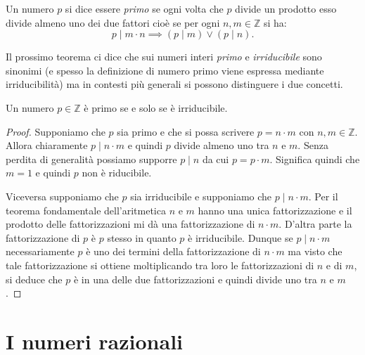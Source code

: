 \documentclass[italian,a4paper,hidelinks,headinclude]{scrartcl}
\newcommand{\ZZ}{{\mathbb Z}}
\newcommand{\myemph}[1]{\emph{#1}\marginpar{#1}}
\begin{document}
Un numero $p$ si dice essere \myemph{primo}
se ogni volta che $p$ divide un prodotto esso divide almeno uno dei due fattori
cioè se per ogni $n,m\in \ZZ$ si ha:
\[
  p \mid m\cdot n \implies (p\mid m)\lor(p\mid n).
\]

Il prossimo teorema ci dice che sui numeri interi \emph{primo} e \emph{irriducibile} sono sinonimi (e spesso la definizione di numero primo viene espressa mediante irriducibilità) ma in contesti più generali si possono distinguere i due concetti.

\begin{theorem}
Un numero  $p\in \ZZ$ è primo se e solo se è irriducibile.
\end{theorem}
%
\begin{proof}
Supponiamo che $p$ sia primo e che si possa scrivere $p=n\cdot m$ con $n,m\in\ZZ$.
Allora chiaramente $p\mid n\cdot m$ e quindi $p$ divide almeno uno tra $n$ e $m$.
Senza perdita di generalità possiamo supporre $p\mid n$ da cui $p=p\cdot m$.
Significa quindi che $m=1$ e quindi $p$ non è riducibile.

Viceversa supponiamo che $p$ sia irriducibile e supponiamo che $p\mid n\cdot m$.
Per il teorema fondamentale dell'aritmetica $n$ e $m$ hanno una unica
fattorizzazione e il prodotto delle fattorizzazioni mi dà una fattorizzazione
di $n\cdot m$. D'altra parte la fattorizzazione di $p$ è $p$ stesso in quanto
$p$ è irriducibile. Dunque se $p\mid n\cdot m$ necessariamente $p$ è uno dei
termini della fattorizzazione di $n\cdot m$ ma visto che tale fattorizzazione
si ottiene moltiplicando tra loro le fattorizzazioni di $n$ e di $m$,
si deduce che $p$ è in una delle due fattorizzazioni e quindi divide
uno tra $n$ e $m$.
\end{proof}

\section{I numeri razionali}
\end{document}
